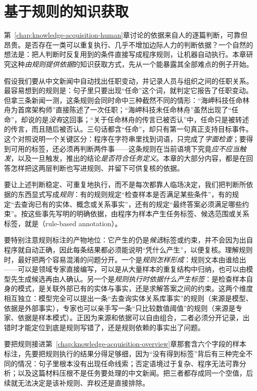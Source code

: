 \chapter{基于规则的知识获取}
\label{chap:rule-based-knowledge-acquisition}

第~\ref{chap:knowledge-acquisition-human}章讨论的依据来自人的逐篇判断，可靠但昂贵。是否存在一类可以重复执行、几乎不增加边际人力的判断依据？一个自然的想法是：把人判断时反复用到的条件直接写成程序规则，让机器自动执行。本章研究这种\emph{由规则提供依据}的知识获取方式，先从一个能暴露其全部难点的例子开始。

假设我们要从中文新闻中自动找出任职变动，并记录人员与组织之间的任职关系。最容易想到的规则是：句子里只要出现“任命”这个词，就判定它报告了任职变动。但拿三条新闻一测，这条规则会同时命中三种截然不同的情形：“海岬科技任命林舟为首席架构师”直接陈述了一次任职；“海岬科技未任命林舟”虽然出现了“任命”，却说的是\emph{没有}这回事；“关于任命林舟的传言已被否认”中，任命只是被转述的传言，而且随后被否认。三句话都含“任命”，却只有第一句真正支持目标事件。这个对照说明一个关键区分：程序在字符串里找到词语，只完成了\emph{字面检查}；要得到可用的标签，还必须再判断两件事——这条规则在当前语境下究竟\emph{应不应当触发}，以及一旦触发，推出的结论\emph{是否符合任务定义}。本章的大部分内容，都是在回答怎样把这两层判断也写进规则、并留下可供复核的依据。

要让上述判断稳定、可重复地执行，而不是每次都靠人临场决定，我们把判断所依据的东西显式写成\emph{规则}：有的规则规定“检查样本是否满足某些条件”，有的规定“去查询已有的实体、概念或关系事实”，还有的规定“最终答案必须满足哪些约束”。按这些事先写明的明确依据，由程序为样本产生任务标签、候选范围或关系标签，就是（rule-based annotation）。

要特别注意规则标注的产物地位：它产生的仍是\emph{候选}标签或约束，并不会因为出自程序就自动正确，因此每条结果都必须能说明“凭什么产生”，以便复核。理解规则时，最好把两个容易混淆的问题分开。一个是\emph{规则怎样形成}：规则文本由谁给出——可以是领域专家直接编写，可以是从大量样本的重复结构中归纳，也可以由模型先生成候选再由人确认。另一个是\emph{规则执行时依据什么产生标签}：是检查样本自身的模式，是关联外部已有的实体与事实，还是求解答案之间的约束。这两个维度相互独立：模型完全可以提出一条“去查询实体关系库事实”的规则（来源是模型、依据是外部事实），专家也可以亲手写一条“只比较数值阈值”的规则（来源是专家、依据是样本模式）。正因为来源和依据可以自由组合，二者必须分开记录，出错时才能定位到底是规则写错了，还是规则依赖的事实出了问题。

要把规则接进第~\ref{chap:knowledge-acquisition-overview}章那套含六个字段的样本标注，先要把规则执行的结果分得足够细，因为“没有得到标签”背后有三种完全不同的情况：句子里根本没有出现任命线索；否定语境过于复杂、程序无法可靠分析；以及这篇材料压根不是任务要处理的中文新闻。把三者都存成同一个空值，后续就无法决定是该补规则、弃权还是直接排除。

